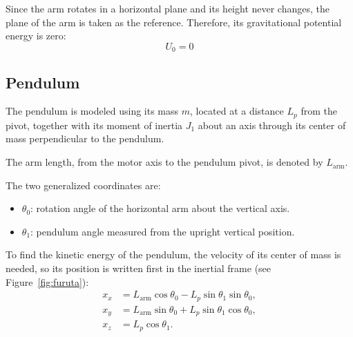 \documentclass[a4paper,11pt]{article}
\newcommand{\La}{L_{\mathrm{arm}}}
\begin{document}
Since the arm rotates in a horizontal plane and its height never changes, the plane of the arm is taken as the reference. Therefore, its gravitational potential energy is zero:
\begin{equation}
  U_0 = 0
\end{equation}

\subsection{Pendulum}
The pendulum is modeled using its mass $m$, located at a distance $L_p$ from the pivot, together with its moment of inertia $J_1$ about an axis through its center of mass perpendicular to the pendulum.

The arm length, from the motor axis to the pendulum pivot, is denoted by $\La$.

The two generalized coordinates are:
\begin{itemize}
  \item $\theta_0$: rotation angle of the horizontal arm about the vertical axis.
  \item $\theta_1$: pendulum angle measured from the upright vertical position.
\end{itemize}

To find the kinetic energy of the pendulum, the velocity of its center of mass is needed, so its position is written first in the inertial frame (see Figure~\ref{fig:furuta}):
\begin{equation}
\begin{aligned}
  x_x &= \La \cos\theta_0 - L_p \sin\theta_1 \sin\theta_0 ,\\
  x_y &= \La \sin\theta_0 + L_p \sin\theta_1 \cos\theta_0 ,\\
  x_z &= L_p \cos\theta_1 .
\end{aligned}
\label{eq:pos}
\end{equation}
\end{document}
